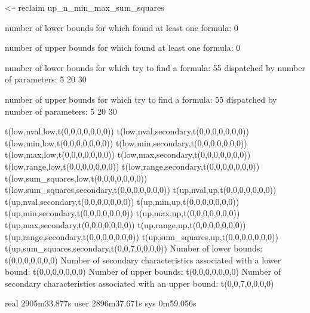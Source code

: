 <-- reclaim up_n_min_max_sum_squares

number of lower bounds for which found at least one formula: 0

number of upper bounds for which found at least one formula: 0

number of lower bounds for which try to find a formula: 55
dispatched by number of parameters: 5  20  30

number of upper bounds for which try to find a formula: 55
dispatched by number of parameters: 5  20  30

t(low,nval,low,t(0,0,0,0,0,0,0))
t(low,nval,secondary,t(0,0,0,0,0,0,0))
t(low,min,low,t(0,0,0,0,0,0,0))
t(low,min,secondary,t(0,0,0,0,0,0,0))
t(low,max,low,t(0,0,0,0,0,0,0))
t(low,max,secondary,t(0,0,0,0,0,0,0))
t(low,range,low,t(0,0,0,0,0,0,0))
t(low,range,secondary,t(0,0,0,0,0,0,0))
t(low,sum_squares,low,t(0,0,0,0,0,0,0))
t(low,sum_squares,secondary,t(0,0,0,0,0,0,0))
t(up,nval,up,t(0,0,0,0,0,0,0))
t(up,nval,secondary,t(0,0,0,0,0,0,0))
t(up,min,up,t(0,0,0,0,0,0,0))
t(up,min,secondary,t(0,0,0,0,0,0,0))
t(up,max,up,t(0,0,0,0,0,0,0))
t(up,max,secondary,t(0,0,0,0,0,0,0))
t(up,range,up,t(0,0,0,0,0,0,0))
t(up,range,secondary,t(0,0,0,0,0,0,0))
t(up,sum_squares,up,t(0,0,0,0,0,0,0))
t(up,sum_squares,secondary,t(0,0,7,0,0,0,0))
Number of lower bounds:                                             t(0,0,0,0,0,0,0)
Number of secondary characteristics associated with a lower bound:  t(0,0,0,0,0,0,0)
Number of upper bounds:                                             t(0,0,0,0,0,0,0)
Number of secondary characteristics associated with an upper bound: t(0,0,7,0,0,0,0)

real	2905m33.877s
user	2896m37.671s
sys	0m59.056s
